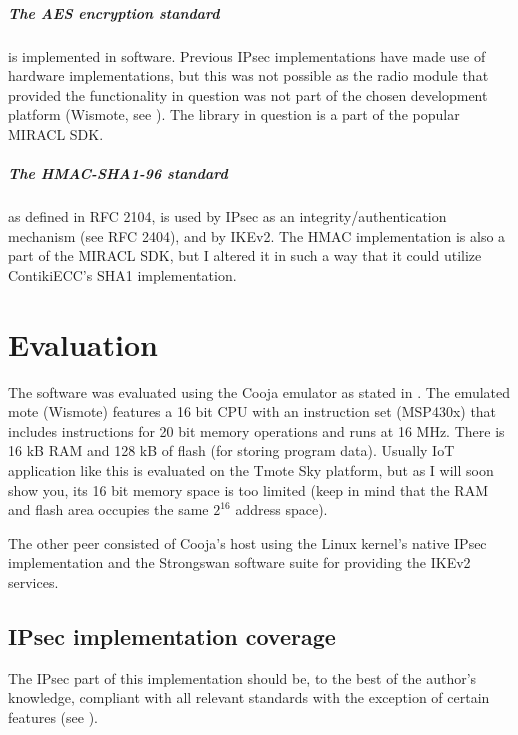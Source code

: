 \documentclass[final,a4paper,twoside,11pt,onecolumn]{report}
\begin{document}
\paragraph{The AES encryption standard} is implemented in software. Previous IPsec implementations\cite{raza11securing} have made use of hardware implementations, but this was not possible as the radio module that provided the functionality in question was not part of the chosen development platform (Wismote, see ). The library in question is a part of the popular MIRACL SDK.

\paragraph{The HMAC-SHA1-96 standard} as defined in RFC 2104\cite{rfc2104}, is used by IPsec as an integrity/authentication mechanism (see RFC 2404\cite{rfc2404}), and by IKEv2. The HMAC implementation is also a part of the MIRACL SDK, but I altered it in such a way that it could utilize ContikiECC's SHA1 implementation.


\chapter{Evaluation}
\label{cha:eval}
The software was evaluated using the Cooja emulator as stated in . The emulated mote (Wismote) features a 16 bit CPU with an instruction set (MSP430x) that includes instructions for 20 bit memory operations and runs at 16 MHz. There is 16 kB RAM and 128 kB of flash (for storing program data). Usually IoT application like this is evaluated on the Tmote Sky platform, but as I will soon show you, its 16 bit memory space is too limited (keep in mind that the RAM and flash area occupies the same $2^16$ address space).

The other peer consisted of Cooja's host using the Linux kernel's native IPsec implementation and the Strongswan software suite for providing the IKEv2 services.

\section{IPsec implementation coverage}
The IPsec part of this implementation should be, to the best of the author's knowledge, compliant with all relevant standards with the exception of certain features (see ).
\end{document}
